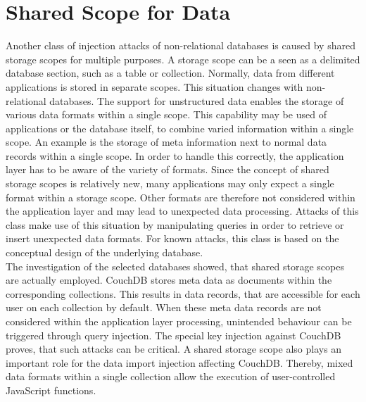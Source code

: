 \section{Shared Scope for Data}
Another class of injection attacks of non-relational databases is caused by shared storage scopes for multiple purposes. A storage scope can be a seen as a delimited database section, such as a table or collection. Normally, data from different applications is stored in separate scopes. This situation changes with non-relational databases. The support for unstructured data enables the storage of various data formats within a single scope. This capability may be used of applications or the database itself, to combine varied information within a single scope. An example is the storage of meta information next to normal data records within a single scope. In order to handle this correctly, the application layer has to be aware of the variety of formats. Since the concept of shared storage scopes is relatively new, many applications may only expect a single format within a storage scope. Other formats are therefore not considered within the application layer and may lead to unexpected data processing. Attacks of this class make use of this situation by manipulating queries in order to retrieve or insert unexpected data formats. For known attacks, this class is based on the conceptual design of the underlying database. \\

The investigation of the selected databases showed, that shared storage scopes are actually employed. CouchDB stores meta data as documents within the corresponding collections. This results in data records, that are accessible for each user on each collection by default. When these meta data records are not considered within the application layer processing, unintended behaviour can be triggered through query injection. The special key injection against CouchDB proves, that such attacks can be critical. A shared storage scope also plays an important role for the data import injection affecting CouchDB. Thereby, mixed data formats within a single collection allow the execution of user-controlled JavaScript functions.

